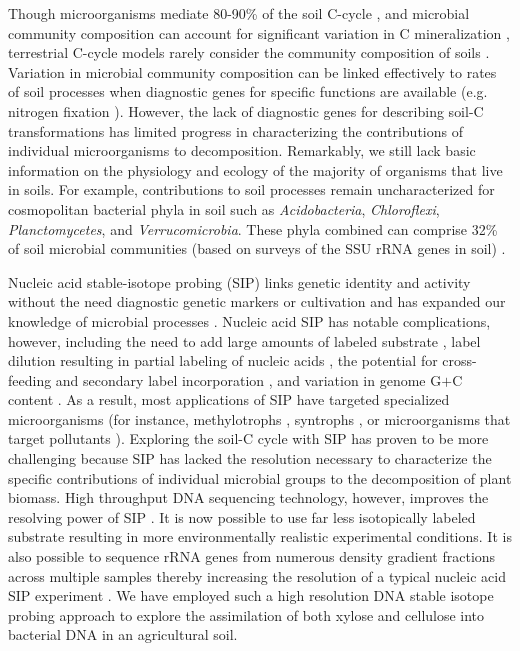 Though microorganisms mediate 80-90\% of the soil C-cycle
\citep{ColemanCrossley_1996,Nannipieri_2003}, and microbial community
composition can account for significant variation in C mineralization
\citep{Strickland_2009}, terrestrial C-cycle models rarely consider the
community composition of soils \citep{Zak2006,Reed2007}. Variation in microbial
community composition can be linked effectively to rates of soil processes when
diagnostic genes for specific functions are available (e.g. nitrogen fixation
\citep{Hsu2009}).  However, the lack of diagnostic genes for describing soil-C
transformations has limited progress in characterizing the contributions of
individual microorganisms to decomposition. Remarkably, we still lack basic
information on the physiology and ecology of the majority of organisms that
live in soils. For example, contributions to soil processes remain
uncharacterized for cosmopolitan bacterial phyla in soil such as
\textit{Acidobacteria}, \textit{Chloroflexi}, \textit{Planctomycetes}, and
\textit{Verrucomicrobia}. These phyla combined can comprise 32\% of soil
microbial communities (based on surveys of the SSU rRNA genes in soil)
\citep{Janssen2006,Buckley2002}. 

Nucleic acid stable-isotope probing (SIP) links genetic identity and activity
without the need diagnostic genetic markers or cultivation and has expanded our
knowledge of microbial processes
\citep{Chen_Murrell_2010}. Nucleic acid SIP has notable complications, however,
including the need to add large amounts of labeled substrate
\citep{radajewski2000stable}, label dilution resulting in partial labeling of
nucleic acids \citep{radajewski2000stable}, the potential for cross-feeding and
secondary label incorporation \citep{DeRito2005}, and variation in genome G$+$C
content \citep{Buckley_2007}.  As a result, most applications of SIP have
targeted specialized microorganisms (for instance, methylotrophs
\citep{lueders2004b}, syntrophs \citep{lueders2004}, or microorganisms that
target pollutants \citep{derito2005}). Exploring the soil-C cycle with SIP has
proven to be more challenging because SIP has lacked the resolution necessary
to characterize the specific contributions of individual microbial groups to
the decomposition of plant biomass. High throughput DNA sequencing technology,
however, improves the resolving power of SIP \citep{Aoyagi2015}. It is now
possible to use far less isotopically labeled substrate resulting in more
environmentally realistic experimental conditions. It is also possible to
sequence rRNA genes from numerous density gradient fractions across multiple
samples thereby increasing the resolution of a typical nucleic acid SIP
experiment \citep{Verastegui_2014}.  We have employed such a high resolution
DNA stable isotope probing approach to explore the assimilation of both xylose
and cellulose into bacterial DNA in an agricultural soil. 

